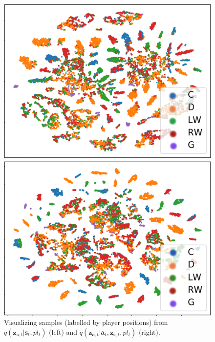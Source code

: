 \documentclass{article}
\newcommand{\latentvariables}{\mathbf{z}}
\newcommand{\state}{\mathbf{s}}
\newcommand{\action}{\mathbf{a}}
\newcommand{\player}{pl}
\begin{document}
\begin{figure}[htbp]
    \begin{minipage}[b]{.5\columnwidth}
    \centering
        \includegraphics[width=0.7\columnwidth]{figures/player_enc_z_cluster5_cvrnn_3901_state_position.png}
    \end{minipage}%
    \begin{minipage}[b]{.5\columnwidth}
    \centering
        \includegraphics[width=0.7\columnwidth]{figures/player_enc_z_cluster5_cvrnn_3901_state_action_position.png}
    \end{minipage}%
    \caption{Visualizing samples (labelled by player positions) from $q(\latentvariables_{\state,t}|\state_{t},\player_{t})$ (left) and $q(\latentvariables_{\action,t}|\action_{t},\latentvariables_{\state,t}, \player_{t})$ (right).}
    \label{fig:layer-visualization}
    \vspace{-0.2in}
\end{figure}
\end{document}
